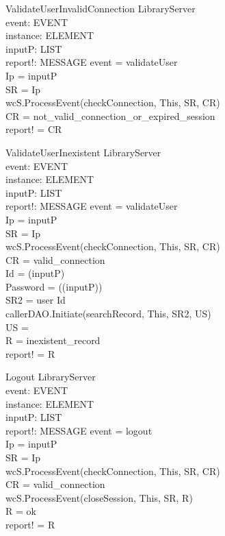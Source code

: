 \begin{schema}{ValidateUserInvalidConnection}
\Delta LibraryServer \\
event: EVENT \\
instance: ELEMENT \\
inputP: LIST \\
report!: MESSAGE
\where event = validateUser \\
Ip = \head inputP \\
SR = \lseq Ip \rseq \\ 
wcS.ProcessEvent(checkConnection, This, SR, CR) \\
CR = not\_valid\_connection\_or\_expired\_session \\ 
report! = CR 
\end{schema}

\begin{schema}{ValidateUserInexistent}
\Delta LibraryServer \\
event: EVENT \\
instance: ELEMENT \\
inputP: LIST \\
report!: MESSAGE
\where event = validateUser \\
Ip = \head inputP \\
SR = \lseq Ip \rseq \\ 
wcS.ProcessEvent(checkConnection, This, SR, CR) \\
CR = valid\_connection \\
Id = \head (\tail inputP) \\
Password = \head (\tail (\tail inputP)) \\
SR2 = \lseq user Id \rseq \\
callerDAO.Initiate(searchRecord, This, SR2, US) \\
US =  \emptyset \\
R = inexistent\_record \\
report! = R 
\end{schema}

\begin{schema}{Logout}
\Delta LibraryServer \\
event: EVENT \\
instance: ELEMENT \\
inputP: LIST \\
report!: MESSAGE
\where event = logout \\
Ip = \head inputP \\
SR = \lseq Ip \rseq \\ 
wcS.ProcessEvent(checkConnection, This, SR, CR) \\
CR = valid\_connection \\
wcS.ProcessEvent(closeSession, This, SR, R) \\
R = ok \\
report! = R  
\end{schema}

